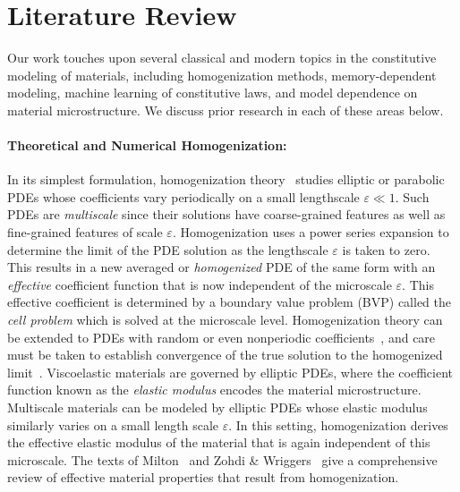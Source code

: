 \section{Literature Review}
\label{ssec:LR}
Our work touches upon several classical and modern topics in the constitutive modeling of materials, including homogenization methods, memory-dependent modeling, machine learning of constitutive laws, and model dependence on material microstructure. We discuss prior research in each of these areas below.

\paragraph{Theoretical and Numerical Homogenization:} In its simplest formulation, homogenization theory~\cite{pavliotis2008multiscale} studies elliptic or parabolic PDEs whose coefficients vary periodically on a small lengthscale $\varepsilon \ll 1$. Such PDEs are \textit{multiscale} since their solutions have coarse-grained features as well as fine-grained features of scale $\varepsilon$. Homogenization uses a power series expansion to determine the limit of the PDE solution as the lengthscale $\varepsilon$ is taken to zero. This results in a new averaged or \textit{homogenized} PDE of the same form with an \textit{effective} coefficient function that is now independent of the microscale $\varepsilon$. This effective coefficient is determined by a boundary value problem (BVP) called the \textit{cell problem} which is solved at the microscale level. Homogenization theory can be extended to PDEs with random or even nonperiodic coefficients~\cite{cioranescu1999introduction, kozlov1980averaging}, and care must be taken to establish convergence of the true solution to the homogenized limit~\cite{allaire1992homogenization, cioranescu1999introduction, pavliotis2008multiscale}. Viscoelastic materials are governed by elliptic PDEs, where the coefficient function known as the \textit{elastic modulus} encodes the material microstructure. Multiscale materials can be modeled by elliptic PDEs whose elastic modulus similarly varies on a small length scale $\varepsilon$. In this setting, homogenization derives the effective elastic modulus of the material that is again independent of this microscale. The texts of Milton~\cite{milton_book} and Zohdi \& Wriggers~\cite{zohdi2008introduction} give a comprehensive review of effective material properties that result from homogenization. 


